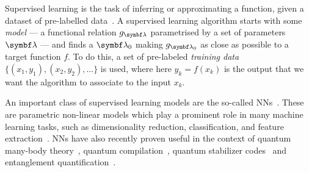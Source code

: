 Supervised learning is the task of inferring or approximating a function, given a dataset of pre-labelled data~\cite{bishop2006pattern,mohri2012foundations}.
A supervised learning algorithm starts with some \emph{model} --- a functional relation $g_{\bs\lambda}$ parametrised by a set of parameters $\bs\lambda$ --- and finds a $\bs\lambda_0$ making $g_{\bs\lambda_0}$ as close as possible to a target function $f$.
To do this, a set of pre-labeled \emph{training data} $\{ (x_1, y_1), (x_2,y_2), ...\}$ is used,
where here $y_k=f(x_k)$ is the output that we want the algorithm to associate to the input $x_k$.

An important class of supervised learning models are the so-called \acp{NN}~\cite{hechtnielsen1989theory,haykin1998neural}.
These are parametric non-linear models which play a prominent role in many machine learning tasks, such as dimensionality reduction, classification, and feature extraction~\cite{hechtnielsen1989theory,haykin1998neural}.
\acp{NN} have also recently proven useful in the context of quantum many-body theory~\cite{amin2016quantum,wang2016discovering,hush2017machine,carleo2017solving,carrasquilla2017machine,torlai2017manybody,broecker2017quantum,deng2017quantum},
quantum compilation~\cite{swaddle2017generating}, quantum stabilizer codes~\cite{krastanov2017deep} and entanglement quantification~\cite{gray2017measuring}.

